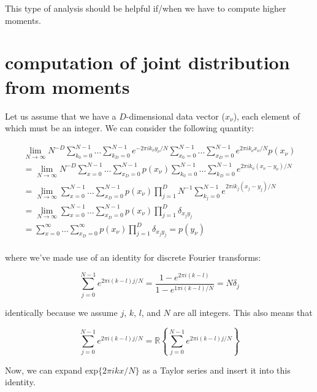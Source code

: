 \documentclass{article}
\begin{document}
This type of analysis should be helpful if/when we have to compute higher moments.

\section{computation of joint distribution from moments}

Let us assume that we have a $D$-dimensional data vector ($x_\nu$), each element of which must be an integer.
We can consider the following quantity:

\begin{multline}
	\lim_{N\rightarrow\infty} N^{-D} \sum_{k_0=0}^{N-1} \ldots \sum_{k_D=0}^{N-1} e^{-2\pi i k_\nu y_\nu / N} \sum_{x_0=0}^{N-1} \ldots \sum_{x_D=0}^{N-1} e^{2\pi i k_\nu x_\nu /N} p(x_\nu) \\
	= \lim_{N\rightarrow\infty} N^{-D} \sum_{x=0}^{N-1} \ldots \sum_{x_D=0}^{N-1} p(x_\nu) \sum_{k_0=0}^{N-1} \ldots \sum_{k_D=0}^{N-1} e^{2\pi i k_\nu (x_\nu - y_\nu) / N} \\
	= \lim_{N\rightarrow\infty} \sum_{x=0}^{N-1} \ldots \sum_{x_D=0}^{N-1} p(x_\nu) \prod_{j=1}^{D} N^{-1} \sum_{k_j=0}^{N-1} e^{2\pi i k_j (x_j - y_j) / N} \\
	= \lim_{N\rightarrow\infty} \sum_{x=0}^{N-1} \ldots \sum_{x_D=0}^{N-1} p(x_\nu) \prod_{j=1}^{D} \delta_{x_j y_j} \\
	= \sum_{x=0}^{\infty} \ldots \sum_{x_D=0}^{\infty} p(x_\nu) \prod_{j=1}^{D} \delta_{x_j y_j} = p(y_\nu) \\
\end{multline}

\noindent
where we've made use of an identity for discrete Fourier transforms:

\begin{equation}
	\sum_{j=0}^{N-1} e^{2\pi i (k-l) j /N} = \frac{1-e^{2\pi i (k-l)}}{1-e^{1\pi i (k-l)/N}} = N \delta_j
\end{equation}

\noindent
identically because we assume $j$, $k$, $l$, and $N$ are all integers.
This also means that 

\begin{equation}
	\sum_{j=0}^{N-1} e^{2\pi i (k-l) j /N} = \mathbb{R}\left\{ \sum_{j=0}^{N-1} e^{2\pi i (k-l) j /N} \right\}
\end{equation}

Now, we can expand $\mathrm{exp}\{2\pi i k x /N\}$ as a Taylor series and insert it into this identity.
\end{document}
